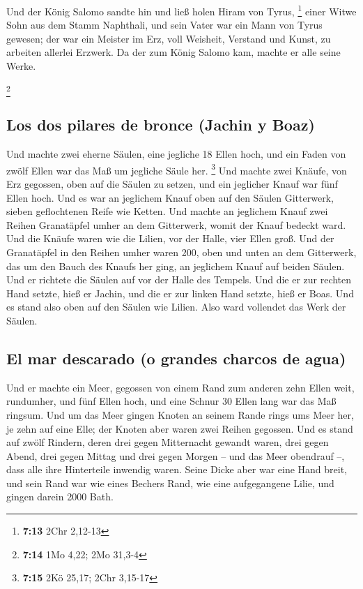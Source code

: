  Und der König Salomo sandte hin und ließ holen Hiram von
Tyrus, \footnote{\textbf{7:13} 2Chr 2,12-13}  einer Witwe
Sohn aus dem Stamm Naphthali, und sein Vater war ein Mann von Tyrus
gewesen; der war ein Meister im Erz, voll Weisheit, Verstand und Kunst,
zu arbeiten allerlei Erzwerk. Da der zum König Salomo kam, machte er
alle seine Werke.

\footnote{\textbf{7:14} 1Mo 4,22; 2Mo 31,3-4}

\hypertarget{los-dos-pilares-de-bronce-jachin-y-boaz}{%
\subsection{Los dos pilares de bronce (Jachin y
Boaz)}\label{los-dos-pilares-de-bronce-jachin-y-boaz}}

 Und machte zwei eherne Säulen, eine jegliche 18 Ellen
hoch, und ein Faden von zwölf Ellen war das Maß um jegliche Säule her.
\footnote{\textbf{7:15} 2Kö 25,17; 2Chr 3,15-17}  Und
machte zwei Knäufe, von Erz gegossen, oben auf die Säulen zu setzen, und
ein jeglicher Knauf war fünf Ellen hoch.  Und es war an
jeglichem Knauf oben auf den Säulen Gitterwerk, sieben geflochtenen
Reife wie Ketten.  Und machte an jeglichem Knauf zwei
Reihen Granatäpfel umher an dem Gitterwerk, womit der Knauf bedeckt
ward.  Und die Knäufe waren wie die Lilien, vor der
Halle, vier Ellen groß.  Und der Granatäpfel in den
Reihen umher waren 200, oben und unten an dem Gitterwerk, das um den
Bauch des Knaufs her ging, an jeglichem Knauf auf beiden Säulen.
 Und er richtete die Säulen auf vor der Halle des
Tempels. Und die er zur rechten Hand setzte, hieß er Jachin, und die er
zur linken Hand setzte, hieß er Boas.  Und es stand also
oben auf den Säulen wie Lilien. Also ward vollendet das Werk der Säulen.

\hypertarget{el-mar-descarado-o-grandes-charcos-de-agua}{%
\subsection{El mar descarado (o grandes charcos de
agua)}\label{el-mar-descarado-o-grandes-charcos-de-agua}}

 Und er machte ein Meer, gegossen von einem Rand zum
anderen zehn Ellen weit, rundumher, und fünf Ellen hoch, und eine Schnur
30 Ellen lang war das Maß ringsum.  Und um das Meer
gingen Knoten an seinem Rande rings ums Meer her, je zehn auf eine Elle;
der Knoten aber waren zwei Reihen gegossen.  Und es stand
auf zwölf Rindern, deren drei gegen Mitternacht gewandt waren, drei
gegen Abend, drei gegen Mittag und drei gegen Morgen -- und das Meer
obendrauf --, dass alle ihre Hinterteile inwendig waren. 
Seine Dicke aber war eine Hand breit, und sein Rand war wie eines
Bechers Rand, wie eine aufgegangene Lilie, und gingen darein 2000 Bath.

